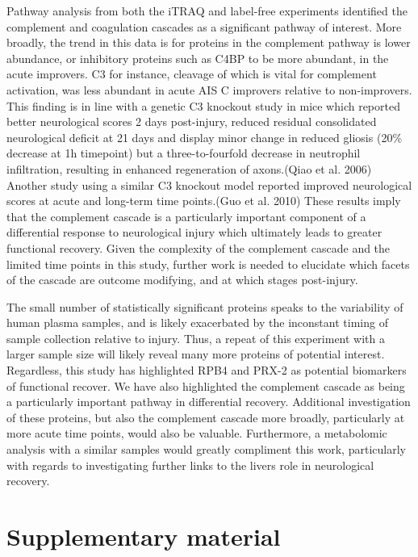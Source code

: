 \documentclass[9pt,lineno]{elife}
\begin{document}
\begin{landscape}
\begin{landscape}
Pathway analysis from both the iTRAQ and label-free experiments identified the complement and coagulation cascades as a significant pathway of interest.
More broadly, the trend in this data is for proteins in the complement pathway is lower abundance, or inhibitory proteins such as C4BP to be more abundant, in the acute improvers.
C3 for instance, cleavage of which is vital for complement activation, was less abundant in acute AIS C improvers relative to non-improvers.
This finding is in line with a genetic C3 knockout study in mice which reported better neurological scores 2 days post-injury, reduced residual consolidated neurological deficit at 21 days and display minor change in reduced gliosis (20\% decrease at 1h timepoint) but a three-to-fourfold decrease in neutrophil infiltration, resulting in enhanced regeneration of axons.(Qiao et al. 2006) Another study using a similar C3 knockout model reported improved neurological scores at acute and long-term time points.(Guo et al. 2010)
These results imply that the complement cascade is a particularly important component of a differential response to neurological injury which ultimately leads to greater functional recovery.
Given the complexity of the complement cascade and the limited time points in this study, further work is needed to elucidate which facets of the cascade are outcome modifying, and at which stages post-injury.

The small number of statistically significant proteins speaks to the variability of human plasma samples, and is likely exacerbated by the inconstant timing of sample collection relative to injury.
Thus, a repeat of this experiment with a larger sample size will likely reveal many more proteins of potential interest.
Regardless, this study has highlighted RPB4 and PRX-2 as potential biomarkers of functional recover.
We have also highlighted the complement cascade as being a particularly important pathway in differential recovery.
Additional investigation of these proteins, but also the complement cascade more broadly, particularly at more acute time points, would also be valuable.
Furthermore, a metabolomic analysis with a similar samples would greatly compliment this work, particularly with regards to investigating further links to the livers role in neurological recovery.

\newpage

\hypertarget{sup-data}{%
\section*{Supplementary material}\label{sup-data}}


\end{landscape}
\end{landscape}
\end{document}
